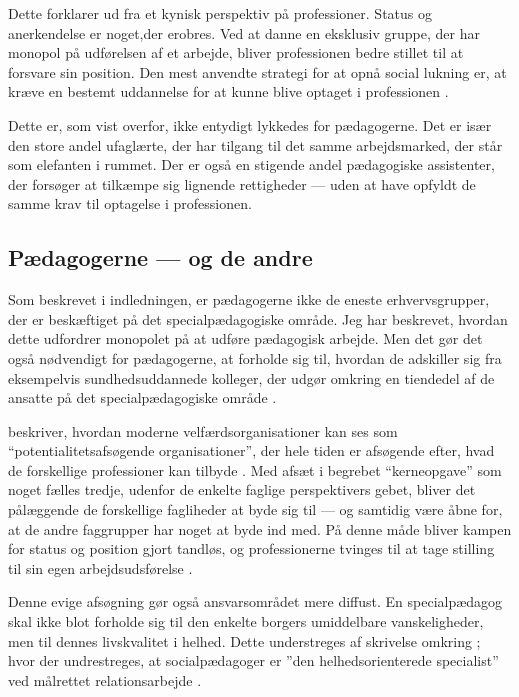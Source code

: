 Dette forklarer \citeauthor{frederiksenVelfaerdsprofessionerMellemOmsorg2017} ud fra et kynisk perspektiv på professioner.
Status og anerkendelse er noget,der erobres.
Ved at danne en eksklusiv gruppe, der har monopol på udførelsen af et arbejde, bliver professionen bedre stillet til at forsvare sin position.
Den mest anvendte strategi for at opnå social lukning er, at kræve en bestemt uddannelse for at kunne blive optaget i professionen \autocite[s. 451ff]{frederiksenVelfaerdsprofessionerMellemOmsorg2017}.

Dette er, som vist overfor, ikke entydigt lykkedes for pædagogerne.
Det er især den store andel ufaglærte, der har tilgang til det samme arbejdsmarked, der står som elefanten i rummet.
Der er også en stigende andel pædagogiske assistenter, der forsøger at tilkæmpe sig lignende rettigheder — uden at have opfyldt de samme krav til optagelse i professionen.

\subsection{Pædagogerne — og de andre}

Som beskrevet i indledningen, er pædagogerne ikke de eneste erhvervsgrupper, der er beskæftiget på det specialpædagogiske område.
Jeg har beskrevet, hvordan dette udfordrer monopolet på at udføre pædagogisk arbejde.
Men det gør det også nødvendigt for pædagogerne, at forholde sig til, hvordan de adskiller sig fra eksempelvis sundhedsuddannede kolleger, der udgør omkring en tiendedel af de ansatte på det specialpædagogiske område \autocite[s. 8f]{kommunerneslandsforeningFaktaOmKommunernes2019}.

\citeauthor{porsKerneloseKerneopgaverSkolen2015} beskriver, hvordan moderne velfærdsorganisationer kan ses som “potentialitetsafsøgende organisationer”, der hele tiden er afsøgende efter, hvad de forskellige professioner kan tilbyde \autocite[s 310]{porsKerneloseKerneopgaverSkolen2015}.
Med afsæt i begrebet “kerneopgave” som noget fælles tredje, udenfor de enkelte faglige perspektivers gebet, bliver det pålæggende de forskellige fagliheder at byde sig til — og samtidig være åbne for, at de andre faggrupper har noget at byde ind med.
På denne måde bliver kampen for status og position gjort tandløs, og professionerne tvinges til at tage stilling til sin egen arbejdsudsførelse \autocite[s. 311 ff.]{porsKerneloseKerneopgaverSkolen2015}.

Denne evige afsøgning gør også ansvarsområdet mere diffust. En specialpædagog skal ikke blot forholde sig til den enkelte borgers umiddelbare vanskeligheder, men til dennes livskvalitet i helhed.
Dette understreges af \citeauthor{socialpaedagogerneSocialpaedagogiskeKernefaglighed2015} skrivelse omkring ; hvor der undrestreges, at socialpædagoger er ”den helhedsorienterede specialist” ved målrettet relationsarbejde \autocite{socialpaedagogerneSocialpaedagogiskeKernefaglighed2015}.


